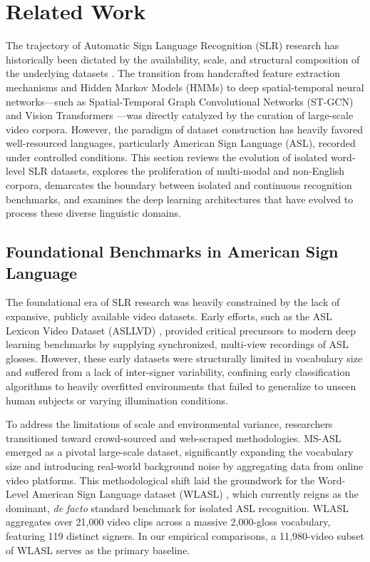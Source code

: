 \documentclass{ieeeaccess}
\begin{document}
\section{Related Work} \label{sec:related}

The trajectory of Automatic Sign Language Recognition (SLR) research has historically been dictated by the availability, scale, and structural composition of the underlying datasets \cite{rastgoo2021sign}. The transition from handcrafted feature extraction mechanisms and Hidden Markov Models (HMMs) to deep spatial-temporal neural networks—such as Spatial-Temporal Graph Convolutional Networks (ST-GCN) \cite{jiang2021skeleton} and Vision Transformers \cite{camgoz2020sign}—was directly catalyzed by the curation of large-scale video corpora. However, the paradigm of dataset construction has heavily favored well-resourced languages, particularly American Sign Language (ASL), recorded under controlled conditions. This section reviews the evolution of isolated word-level SLR datasets, explores the proliferation of multi-modal and non-English corpora, demarcates the boundary between isolated and continuous recognition benchmarks, and examines the deep learning architectures that have evolved to process these diverse linguistic domains.

\subsection{Foundational Benchmarks in American Sign Language}
The foundational era of SLR research was heavily constrained by the lack of expansive, publicly available video datasets. Early efforts, such as the ASL Lexicon Video Dataset (ASLLVD) \cite{neidle2012asllvd}, provided critical precursors to modern deep learning benchmarks by supplying synchronized, multi-view recordings of ASL glosses. However, these early datasets were structurally limited in vocabulary size and suffered from a lack of inter-signer variability, confining early classification algorithms to heavily overfitted environments that failed to generalize to unseen human subjects or varying illumination conditions. 

To address the limitations of scale and environmental variance, researchers transitioned toward crowd-sourced and web-scraped methodologies. MS-ASL \cite{joze2019msasl} emerged as a pivotal large-scale dataset, significantly expanding the vocabulary size and introducing real-world background noise by aggregating data from online video platforms. This methodological shift laid the groundwork for the Word-Level American Sign Language dataset (WLASL) \cite{li2020wlasl}, which currently reigns as the dominant, \emph{de facto} standard benchmark for isolated ASL recognition. WLASL aggregates over 21,000 video clips across a massive 2,000-gloss vocabulary, featuring 119 distinct signers. In our empirical comparisons, a 11,980-video subset of WLASL serves as the primary baseline.
\end{document}
